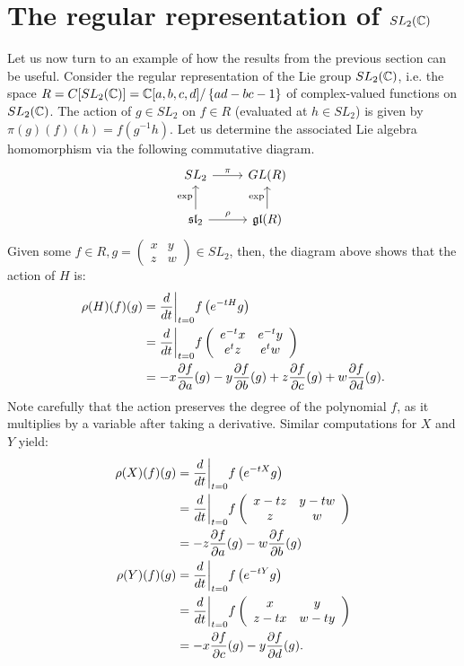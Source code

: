 \documentclass{../mathnotes}
\begin{document}
\section{The regular representation of $SL_2(\mathbb{C})$}

Let us now turn to an example of how the results from the previous section can be useful.
Consider the regular representation of the Lie group $SL_2(\mathbb{C})$, i.e. the space $R=C[SL_2(\mathbb{C})]=\mathbb{C}[a,b,c,d]/\left\{ ad-bc-1 \right\}$
of complex-valued functions on $SL_2(\mathbb{C})$. The action of $g\in SL_2$ on $f\in R$ (evaluated at $h\in SL_2$) is given by $\pi(g)(f)(h)=f(g^{-1}h)$.
Let us determine the associated Lie algebra homomorphism via the following commutative diagram. 
\begin{equation*}
    \begin{tikzcd}
        SL_2\arrow{r}{\pi} & GL(R)\\
        \fr{sl}_2\arrow{r}{\rho}\arrow{u}{\exp} & \fr{gl}(R)\arrow{u}{\exp}
    \end{tikzcd}
\end{equation*}
Given some $f\in R,g=\left(\begin{smallmatrix}x&y\\z&w\end{smallmatrix}\right)\in SL_2$, then, the diagram above
shows that the action of $H$ is:
\begin{align*}
    \rho(H)(f)(g)&=\frac{d}{dt}\bigg|_{t=0}f\left( e^{-tH}g  \right)\\
    &=\frac{d}{dt}\bigg|_{t=0}f\left( 
    \begin{array}[]{cc}
        e^{-t}x & e^{-t}y\\
        e^{t}z & e^{t}w
    \end{array}
    \right)\\
    &=-x\frac{\p f}{\p a}(g)-y\frac{\p f}{\p b}(g)+z\frac{\p f}{\p c}(g)+w\frac{\p f}{\p d}(g).
\end{align*}
Note carefully that the action preserves the degree of the polynomial $f$, as it multiplies by a variable
after taking a derivative. Similar computations for $X$ and $Y$ yield:
\begin{align*}
    \rho(X)(f)(g)&=\frac{d}{dt}\bigg|_{t=0}f\left( e^{-tX}g  \right)\\
    &=\frac{d}{dt}\bigg|_{t=0}f\left( 
    \begin{array}[]{cc}
        x-tz & y-tw\\
        z & w
    \end{array}
    \right)\\
    &=-z\frac{\p f}{\p a}(g)-w\frac{\p f}{\p b}(g)\\
    \rho(Y)(f)(g)&=\frac{d}{dt}\bigg|_{t=0}f\left( e^{-tY}g  \right)\\
    &=\frac{d}{dt}\bigg|_{t=0}f\left( 
    \begin{array}[]{cc}
        x & y\\
        z-tx & w-ty
    \end{array}
    \right)\\
    &=-x\frac{\p f}{\p c}(g)-y\frac{\p f}{\p d}(g).
\end{align*}
\end{document}
